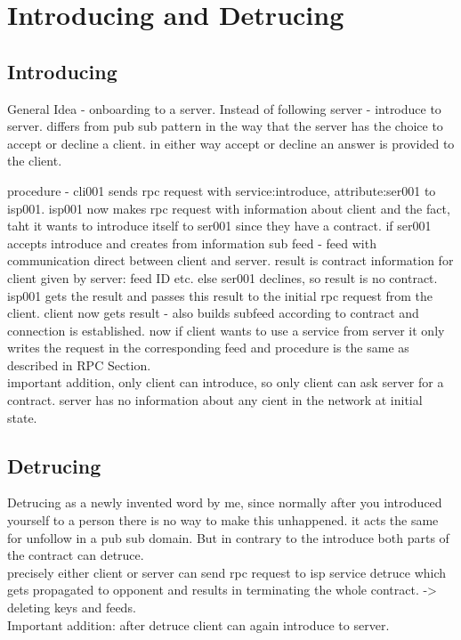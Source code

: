 \section{Introducing and Detrucing}
\subsection{Introducing}
General Idea - 
onboarding to a server. Instead of following server - introduce to server. differs from pub sub pattern in the way that the server has the choice to accept or decline a client. in either way accept or decline an answer is provided to the client.

procedure - cli001 sends rpc request with service:introduce, attribute:ser001 to isp001.
isp001 now makes rpc request with information about client and the fact, taht it wants to introduce itself to ser001 since they have a contract. 
if ser001 accepts introduce and creates from information sub feed - feed with communication direct between client and server.
result is contract information for client given by server: feed ID etc.
else ser001 declines, so result is no contract.
isp001 gets the result and passes this result to the initial rpc request from the client. client now gets result - also builds subfeed according to contract and connection is established. now if client wants to use a service from server it only writes the request in the corresponding feed and procedure is the same as described in RPC Section.
\\
important addition, only client can introduce, so only client can ask server for a contract. server has no information about any cient in the network at initial state.
\subsection{Detrucing}
Detrucing as a newly invented word by me, since normally after you introduced yourself to a person there is no way to make this unhappened. it acts the same for unfollow in a pub sub domain. But in contrary to the introduce both parts of the contract can detruce. \\
precisely either client or server can send rpc request to isp service detruce which gets propagated to opponent and results in terminating the whole contract. -> deleting keys and feeds.
\\
Important addition: after detruce client can again introduce to server.

